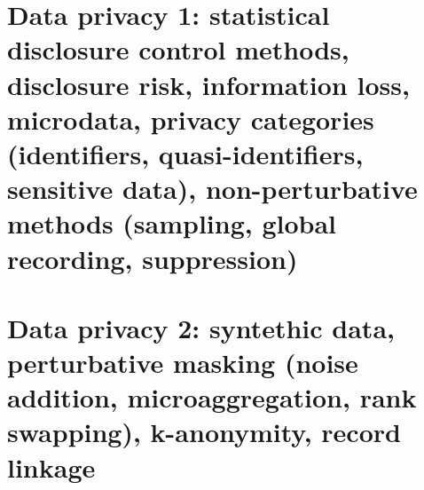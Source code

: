 \clearpage
\section{Data privacy 1: statistical disclosure control methods, disclosure risk, information loss, microdata, privacy categories (identifiers, quasi-identifiers, sensitive data), non-perturbative methods (sampling, global recording, suppression)}

\clearpage
\section{Data privacy 2: syntethic data, perturbative masking (noise addition, microaggregation, rank swapping), k-anonymity, record linkage}
